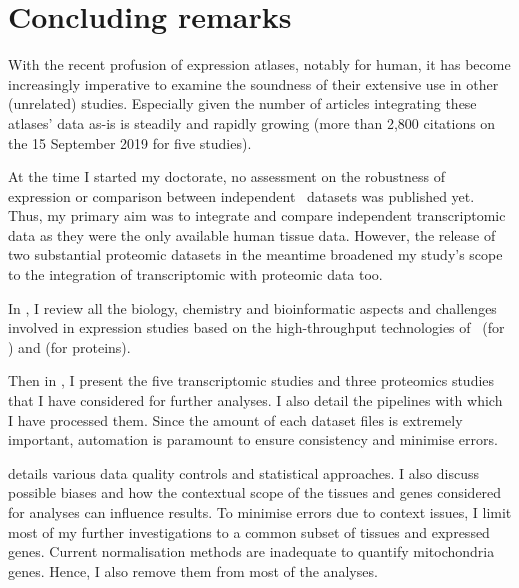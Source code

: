 \chapter{Concluding remarks}\label{ch:conclusion}

\setlength{\epigraphwidth}{0.49\textwidth}%
    \setlength{\epigraphrule}{0pt}%


With the recent profusion of expression atlases,
notably for human,
it has become increasingly imperative to examine
the soundness of their extensive use in other (unrelated) studies.
Especially given the number of articles integrating
these atlases' data as-is is steadily and rapidly growing
(more than 2,800 citations on the 15 September 2019 for five studies).

At the time I started my doctorate,
no assessment on the robustness of expression or
comparison between independent \Rnaseq\ datasets was published yet.
Thus,
my primary aim was to integrate and compare independent transcriptomic data
as they were the only available human tissue data.
However, the release of two substantial proteomic datasets in the meantime
broadened my study's scope
to the integration of transcriptomic with proteomic data too.

In ,
I review all the biology, chemistry and bioinformatic aspects and challenges
involved in expression studies based on the high-throughput technologies
of \Rnaseq\ (for \mRNAs) and \ms{} (for proteins).

Then in ,
I present the five transcriptomic studies and three proteomics studies
that I have considered for further analyses.
I also detail the pipelines with which I have processed them.
Since the amount of each dataset files is extremely important,
automation is paramount to ensure consistency and minimise errors.\mybr\

 details various data quality controls
and statistical approaches.
I also discuss possible biases and
how the contextual scope of the tissues and genes considered for analyses
can influence results.
To minimise errors due to context issues,
I limit most of my further investigations to
a common subset of tissues and expressed genes.
Current normalisation methods are inadequate to quantify mitochondria genes.
Hence, I also remove them from most of the analyses.\mybr\


